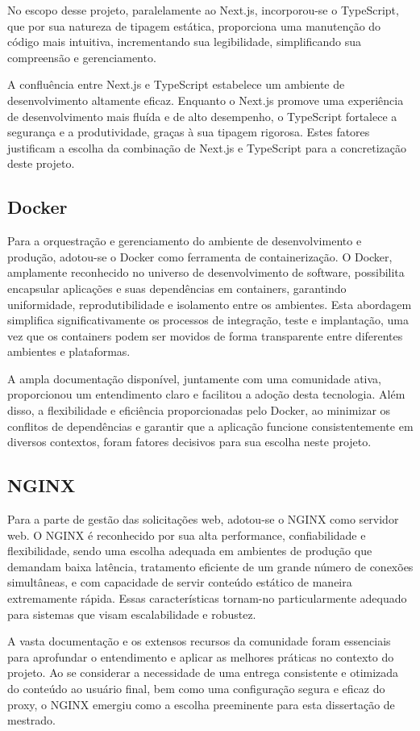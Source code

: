 No escopo desse projeto, paralelamente ao Next.js, incorporou-se o TypeScript, que por sua natureza de tipagem estática, proporciona uma manutenção do código mais intuitiva, incrementando sua legibilidade, simplificando sua compreensão e gerenciamento.

A confluência entre Next.js e TypeScript estabelece um ambiente de desenvolvimento altamente eficaz. Enquanto o Next.js promove uma experiência de desenvolvimento mais fluída e de alto desempenho, o TypeScript fortalece a segurança e a produtividade, graças à sua tipagem rigorosa. Estes fatores justificam a escolha da combinação de Next.js e TypeScript para a concretização deste projeto. 

\subsection{Docker}
Para a orquestração e gerenciamento do ambiente de desenvolvimento e produção, adotou-se o Docker como ferramenta de containerização. O Docker, amplamente reconhecido no universo de desenvolvimento de software, possibilita encapsular aplicações e suas dependências em containers, garantindo uniformidade, reprodutibilidade e isolamento entre os ambientes. Esta abordagem simplifica significativamente os processos de integração, teste e implantação, uma vez que os containers podem ser movidos de forma transparente entre diferentes ambientes e plataformas.

A ampla documentação disponível, juntamente com uma comunidade ativa, proporcionou um entendimento claro e facilitou a adoção desta tecnologia. Além disso, a flexibilidade e eficiência proporcionadas pelo Docker, ao minimizar os conflitos de dependências e garantir que a aplicação funcione consistentemente em diversos contextos, foram fatores decisivos para sua escolha neste projeto.

\subsection{NGINX}
Para a parte de gestão das solicitações web, adotou-se o NGINX como servidor web. O NGINX é reconhecido por sua alta performance, confiabilidade e flexibilidade, sendo uma escolha adequada em ambientes de produção que demandam baixa latência, tratamento eficiente de um grande número de conexões simultâneas, e com capacidade de servir conteúdo estático de maneira extremamente rápida. Essas características tornam-no particularmente adequado para sistemas que visam escalabilidade e robustez. 

A vasta documentação e os extensos recursos da comunidade foram essenciais para aprofundar o entendimento e aplicar as melhores práticas no contexto do projeto. Ao se considerar a necessidade de uma entrega consistente e otimizada do conteúdo ao usuário final, bem como uma configuração segura e eficaz do proxy, o NGINX emergiu como a escolha preeminente para esta dissertação de mestrado.
